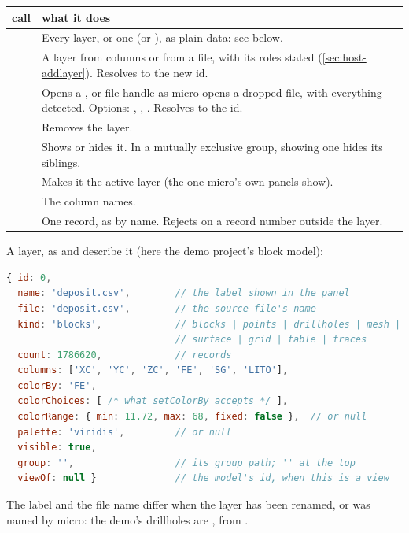 \begin{tabularx}{\linewidth}{@{}>{\raggedright\arraybackslash}p{44mm}L@{}}
\toprule
call & what it does \\
\midrule
{} \newline {} & Every layer, or one (or ), as plain data:
  see below. \\
 & A layer from columns or from a file, with its roles stated
  (\cref{sec:host-addlayer}). Resolves to the new id. \\
 & Opens a ,  or file handle as micro opens a dropped
  file, with everything detected. Options: , , .
  Resolves to the id. \\
 & Removes the layer. \\
 & Shows or hides it. In a mutually exclusive group, showing one hides
  its siblings. \\
 & Makes it the active layer (the one micro's own panels show). \\
 & The column names. \\
 & One record, as  by name. Rejects on a record
  number outside the layer. \\
\bottomrule
\end{tabularx}

A layer, as  and  describe it (here the demo project's block
model):

\begin{lstlisting}[language=js]
{ id: 0,
  name: 'deposit.csv',        // the label shown in the panel
  file: 'deposit.csv',        // the source file's name
  kind: 'blocks',             // blocks | points | drillholes | mesh |
                              // surface | grid | table | traces
  count: 1786620,             // records
  columns: ['XC', 'YC', 'ZC', 'FE', 'SG', 'LITO'],
  colorBy: 'FE',
  colorChoices: [ /* what setColorBy accepts */ ],
  colorRange: { min: 11.72, max: 68, fixed: false },  // or null
  palette: 'viridis',         // or null
  visible: true,
  group: '',                  // its group path; '' at the top
  viewOf: null }              // the model's id, when this is a view
\end{lstlisting}

The label and the file name differ when the layer has been renamed, or was named by micro: the
demo's drillholes are , from .

